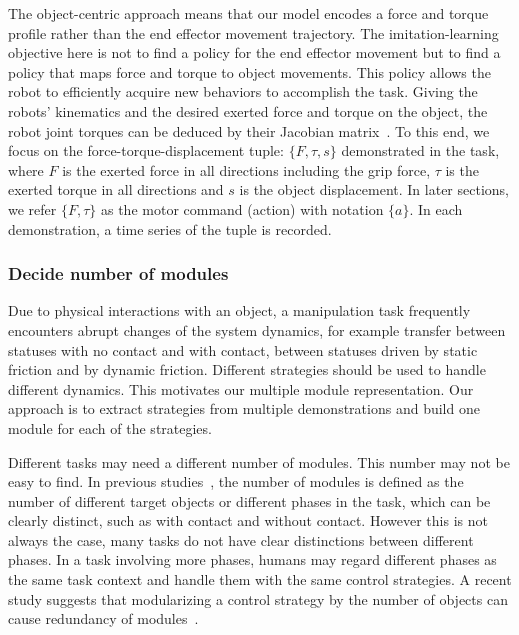 The object-centric approach means that our model encodes a force and
torque profile rather than the end effector movement trajectory.  The
imitation-learning objective here is not to find a policy for the end
effector movement but to find a policy that maps force and torque
to object movements. This policy allows the robot to efficiently
acquire new behaviors to accomplish the
task. %
Giving the robots' kinematics and the desired exerted force and torque
on the object, the robot joint torques can be deduced by their Jacobian
matrix~\citep{okamura2000overview}. To this end, we focus on the
force-torque-displacement tuple: $\{F,\tau,s\}$ demonstrated in the
task, where $F$ is the exerted force in all directions including the
grip force, $\tau$ is the exerted torque in all directions and $s$ is
the object displacement. In later sections, we refer $\{F,\tau\}$ as
the motor command (action) with notation $\{a\}$. In each
demonstration, a time series of the tuple is recorded.



\subsubsection{Decide number of modules}
\label{cha4:sec2:learn:cluster}

Due to physical interactions with an object, a manipulation task
frequently encounters abrupt changes of the system dynamics, for
example transfer between statuses with no contact and with contact,
between statuses driven by static friction and by
dynamic friction. Different strategies should be used to handle
different dynamics. This motivates our multiple module
representation. Our approach is to extract strategies from multiple
demonstrations and build one module for each of the
strategies.

Different tasks may need a different number of modules. This number may not be easy to find. In previous studies~\cite{sugimoto2012emosaic,haruno2001mosaic}, the number of modules is defined as the number of different target objects or different phases in the task, which can be clearly distinct, such as with contact and without contact. However this is not always the case, many tasks do not have clear distinctions between different phases.
In a task involving more phases, humans may regard different phases as the same task context and handle them with the same control strategies. A recent study suggests that modularizing a control strategy by the number of objects can cause redundancy of modules~\cite{lallee2009}.

